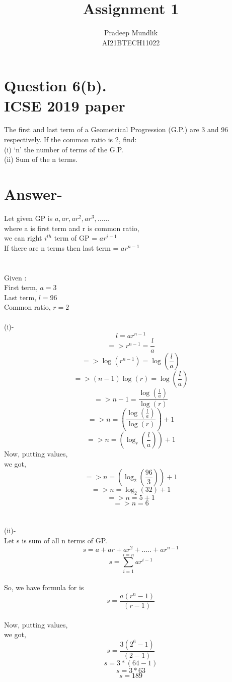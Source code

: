\documentclass[ twocoloumns, 20pts]{IEEEtran}
\begin{document}
\title{\huge{Assignment 1}}
\author{\Large{Pradeep Mundlik}\\AI21BTECH11022}
\maketitle

\section*{\Large{Question 6(b).}\\ICSE 2019 paper}
\Large{The first and last term of a Geometrical Progression (G.P.) are 3 and 96
respectively. If the common ratio is 2, find:\\
(i) ‘n’ the number of terms of the G.P.\\
(ii) Sum of the n terms.}
\section*{\Large{Answer-}}
Let given GP is $ a, ar, ar^2, ar^3,...... $ \\ where a is first term and r is common ratio,\\
we can right $i^{th}$ term of GP = $ar^{i-1}$\\
If there are n terms then last term = $ar^{n-1}$\\
\\\\Given : \\
First term, $a = 3 $\\
Last term, $l = 96$\\
Common ratio, $r = 2$\\
\\(i)- \\
$$l = ar^{n-1}$$
$$=> r^{n-1} = \frac{l}{a}$$
$$=> \log(r^{n-1}) = \log\left(\frac{l}{a}\right)$$
$$=> (n-1)\log(r) = \log\left(\frac{l}{a}\right)$$
$$=> n-1 = \frac{\log\left(\frac{l}{a}\right)}{\log(r)}$$
$$=> n = \left(\frac{\log\left(\frac{l}{a}\right)}{\log(r)}\right) + 1 $$
$$=> n = \left(\log_r\left(\frac{l}{a}\right)\right) + 1 $$
Now, putting values,\\
we got, 
$$=> n = \left(\log_2\left(\frac{96}{3}\right)\right) + 1 $$
$$=> n = \log_2(32) + 1 $$
$$=> n = 5 + 1 $$
$$=> n = 6 $$
\\
\\(ii)-\\
Let s is sum of all n terms of GP.\\
$$s = a + ar + ar^2 +.....+ ar^{n-1}$$\;
$$s = \sum_{i=1}^{i=n} ar^{i-1}$$\\
So, we have formula for is\;
$$ s = \frac{a\left(r^n-1\right)}{\left(r-1\right)}$$\\
Now, putting values,\\
we got,
$$s = \frac{3\left(2^6-1\right)}{\left(2-1\right)}$$\;
$$s = 3*(64-1)$$
$$s = 3*63$$
$$s = 189$$
\end{document}
